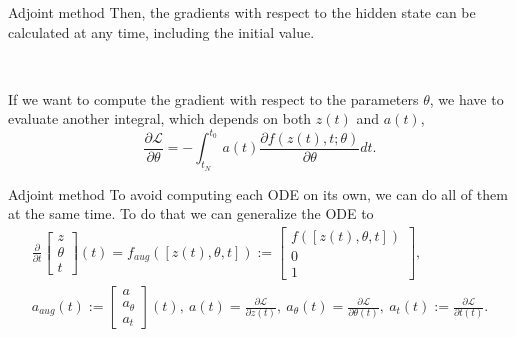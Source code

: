\documentclass[11pt]{beamer}
\begin{document}
\begin{frame}{Adjoint method}
Then, the gradients with respect to the hidden state can be calculated at any time, including the initial value. 

~

If we want to compute the gradient with respect to the parameters $\theta$, we have to evaluate another integral, which depends on both $z(t)$ and $a(t)$,
\begin{equation}
\label{devtheta}
\frac{\partial \mathcal{L}}{\partial \theta} = - \int^{t_0}_{t_N} a(t) \frac{\partial f(z(t),t;\theta)} {\partial \theta} dt.
\end{equation}
\end{frame}

\begin{frame}{Adjoint method}
To avoid computing each ODE on its own, we can do all of them at the same time. To do that we can generalize the ODE to
\begin{eqnarray*}
\frac{\partial}{\partial t} \begin{bmatrix}
							z \\ \theta \\ t
							\end{bmatrix} (t) 
= f_{aug}([z(t),\theta ,t]) := \begin{bmatrix}
							f([z(t),\theta ,t]) \\ 0 \\ 1
							\end{bmatrix}, \\
a_{aug} (t) := \begin{bmatrix}
			a \\ a_{\theta} \\ a_t
			\end{bmatrix} (t) , \ 
a(t) = \frac{\partial \mathcal{L}}{\partial z(t)}, \ 
a_\theta (t) = \frac{\partial \mathcal{L}}{\partial \theta (t)}, \ 
a_t(t) := \frac{\partial \mathcal{L}}{\partial t(t)}.
\end{eqnarray*}
\end{frame}
\end{document}
